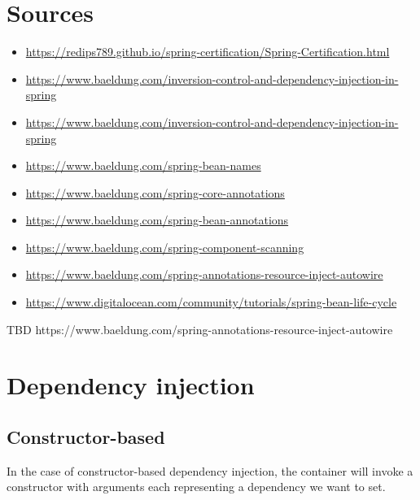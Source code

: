 \documentclass{scrartcl}
\begin{document}

\section{Sources}

\begin{itemize}
    \item \url{https://redips789.github.io/spring-certification/Spring-Certification.html}
    \item \url{https://www.baeldung.com/inversion-control-and-dependency-injection-in-spring}
    \item \url{https://www.baeldung.com/inversion-control-and-dependency-injection-in-spring}


    \item \url{https://www.baeldung.com/spring-bean-names}
    \item \url{https://www.baeldung.com/spring-core-annotations}
    \item \url{https://www.baeldung.com/spring-bean-annotations}
    \item \url{https://www.baeldung.com/spring-component-scanning}
    \item \url{https://www.baeldung.com/spring-annotations-resource-inject-autowire}
    \item \url{https://www.digitalocean.com/community/tutorials/spring-bean-life-cycle}
\end{itemize}

TBD
https://www.baeldung.com/spring-annotations-resource-inject-autowire

\section{Dependency injection}
\subsection{Constructor-based}

    In the case of constructor-based dependency injection, the container will invoke a constructor with arguments each representing a dependency we want to set.
\end{document}
